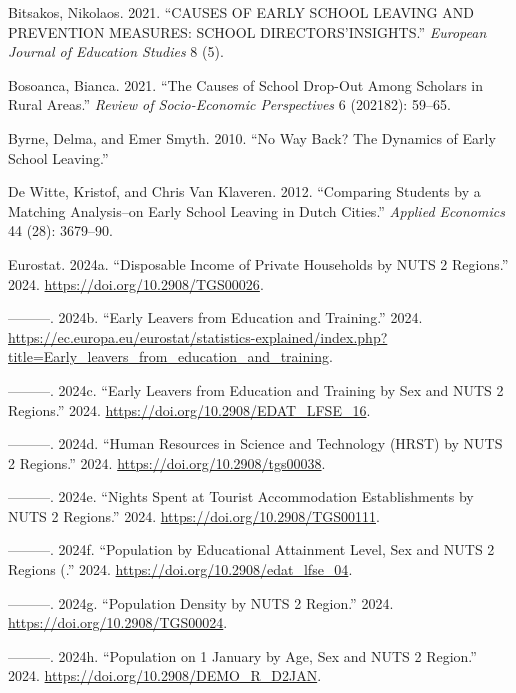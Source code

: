 \documentclass[
  letterpaper,
  DIV=11,
  numbers=noendperiod,
  abstract]{scrartcl}
\newlength{\cslhangindent}
\newenvironment{CSLReferences}[2] %
 {\begin{list}{}{%
  \setlength{\itemindent}{0pt}
  \setlength{\leftmargin}{0pt}
  \setlength{\parsep}{0pt}
  \ifodd #1
   \setlength{\leftmargin}{\cslhangindent}
   \setlength{\itemindent}{-1\cslhangindent}
  \fi
  \setlength{\itemsep}{#2\baselineskip}}}
 {\end{list}}
\begin{document}
\label{refs}
\begin{CSLReferences}{1}{0}
Bitsakos, Nikolaos. 2021. {``CAUSES OF EARLY SCHOOL LEAVING AND
PREVENTION MEASURES: SCHOOL DIRECTORS'INSIGHTS.''} \emph{European
Journal of Education Studies} 8 (5).

Bosoanca, Bianca. 2021. {``The Causes of School Drop-Out Among Scholars
in Rural Areas.''} \emph{Review of Socio-Economic Perspectives} 6
(202182): 59--65.

Byrne, Delma, and Emer Smyth. 2010. {``No Way Back? The Dynamics of
Early School Leaving.''}

De Witte, Kristof, and Chris Van Klaveren. 2012. {``Comparing Students
by a Matching Analysis--on Early School Leaving in Dutch Cities.''}
\emph{Applied Economics} 44 (28): 3679--90.

Eurostat. 2024a. {``Disposable Income of Private Households by NUTS 2
Regions.''} 2024. \url{https://doi.org/10.2908/TGS00026}.

---------. 2024b. {``Early Leavers from Education and Training.''} 2024.
\url{https://ec.europa.eu/eurostat/statistics-explained/index.php?title=Early_leavers_from_education_and_training}.

---------. 2024c. {``Early Leavers from Education and Training by Sex
and NUTS 2 Regions.''} 2024. \url{https://doi.org/10.2908/EDAT_LFSE_16}.

---------. 2024d. {``Human Resources in Science and Technology (HRST) by
NUTS 2 Regions.''} 2024. \url{https://doi.org/10.2908/tgs00038}.

---------. 2024e. {``Nights Spent at Tourist Accommodation
Establishments by NUTS 2 Regions.''} 2024.
\url{https://doi.org/10.2908/TGS00111}.

---------. 2024f. {``Population by Educational Attainment Level, Sex and
NUTS 2 Regions (.''} 2024. \url{https://doi.org/10.2908/edat_lfse_04}.

---------. 2024g. {``Population Density by NUTS 2 Region.''} 2024.
\url{https://doi.org/10.2908/TGS00024}.

---------. 2024h. {``Population on 1 January by Age, Sex and NUTS 2
Region.''} 2024. \url{https://doi.org/10.2908/DEMO_R_D2JAN}.


\end{CSLReferences}
\end{document}
